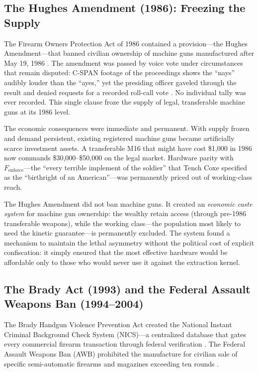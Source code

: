 \documentclass[12pt,openany]{book}
\begin{document}
\subsection{The Hughes Amendment (1986): Freezing the Supply}

The Firearm Owners Protection Act of 1986 contained a provision---the Hughes Amendment---that banned civilian ownership of machine guns manufactured after May 19, 1986 \cite{hughes1986}. The amendment was passed by voice vote under circumstances that remain disputed: C-SPAN footage of the proceedings shows the ``nays'' audibly louder than the ``ayes,'' yet the presiding officer gaveled through the result and denied requests for a recorded roll-call vote \cite{vizzard2000}. No individual tally was ever recorded. This single clause froze the supply of legal, transferable machine guns at its 1986 level.

The economic consequences were immediate and permanent. With supply frozen and demand persistent, existing registered machine guns became artificially scarce investment assets. A transferable M16 that might have cost \$1,000 in 1986 now commands \$30,000--\$50,000 on the legal market. Hardware parity with $F_{\text{enforce}}$---the ``every terrible implement of the soldier'' that Tench Coxe specified as the ``birthright of an American''---was permanently priced out of working-class reach.

The Hughes Amendment did not ban machine guns. It created an \textit{economic caste system} for machine gun ownership: the wealthy retain access (through pre-1986 transferable weapons), while the working class---the population most likely to need the kinetic guarantee---is permanently excluded. The system found a mechanism to maintain the lethal asymmetry without the political cost of explicit confiscation: it simply ensured that the most effective hardware would be affordable only to those who would never use it against the extraction kernel.

\subsection{The Brady Act (1993) and the Federal Assault Weapons Ban (1994--2004)}

The Brady Handgun Violence Prevention Act created the National Instant Criminal Background Check System (NICS)---a centralized database that gates every commercial firearm transaction through federal verification \cite{brady1993}. The Federal Assault Weapons Ban (AWB) prohibited the manufacture for civilian sale of specific semi-automatic firearms and magazines exceeding ten rounds \cite{awb1994}.
\end{document}
